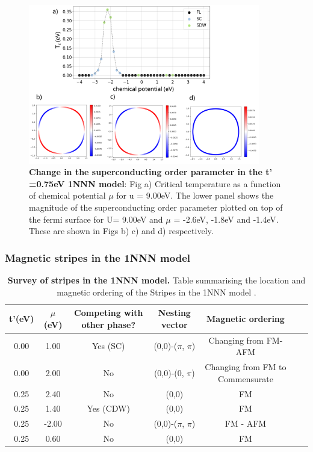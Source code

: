 \documentclass[12pt]{article}
\begin{document}
\begin{figure}[htbp]  %
    \centering
    \includegraphics[width=0.90\textwidth]{1NNNSC_075.png}  %
    \caption{\textbf{Change in the superconducting order parameter in the t' =0.75eV 1NNN model}: Fig a) Critical temperature
    as a function of chemical potential $\mu$ for u = 9.00eV.
    The lower panel shows the magnitude of the superconducting order parameter plotted on top of the fermi surface for U= 9.00eV and $\mu$ = -2.6eV, -1.8eV and -1.4eV. These are shown in Figs b)
    c) and d) respectively.  }
    \label{fig:1NNNSC}
\end{figure}




\subsubsection{Magnetic stripes in the 1NNN model}

\begin{table}[h]
    \centering
    \begin{tabular}{|c|c|c|c|c|c|c|}
        \hline
       t'(eV) & $\mu$ (eV) & Competing with other phase?& Nesting vector & Magnetic ordering  \\
        \hline
        0.00 & 1.00 & Yes (SC) & (0,0)-($\pi$, $\pi$)&  Changing from FM-AFM\\
        \hline
        0.00 & 2.00 &  No  & (0,0)-(0, $\pi$)  & Changing from FM to Commensurate\\
        \hline
        0.25 & 2.40 &  No  & (0,0)  & FM \\
        \hline
        0.25 & 1.40 &  Yes (CDW)  & (0,0)  & FM \\
        \hline
        0.25 & -2.00 & No  & (0,0)-($\pi$, $\pi$)  & FM - AFM\\
        \hline
        0.25 & 0.60 &  No  & (0,0)  & FM \\
          
        \hline
    \end{tabular}
    \caption{\textbf{Survey of stripes in the 1NNN model.} Table summarising the location and magnetic ordering of the Stripes in the 1NNN model .}
    \label{tab:StripesSummary}
\end{table}
\end{document}
